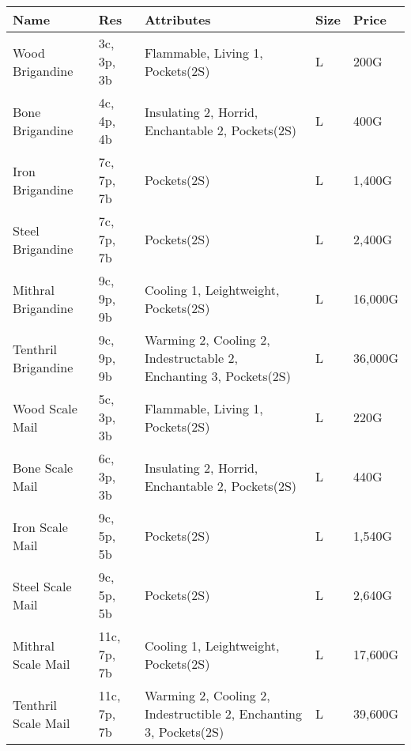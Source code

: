 \begin{longtable}{p{3.5cm} | p{1.5cm} | p{5cm} | p{1cm} | p{1.25cm}}
	Name & Res & Attributes & Size & Price\\ \hline
	Wood Brigandine & 3c, 3p, 3b & Flammable, Living 1, Pockets(2S) & L & 200G\\

	Bone Brigandine & 4c, 4p, 4b & Insulating 2, Horrid, Enchantable 2, Pockets(2S) & L & 400G\\

	Iron Brigandine & 7c, 7p, 7b & Pockets(2S) & L & 1,400G\\

	Steel Brigandine & 7c, 7p, 7b & Pockets(2S) & L & 2,400G\\

	Mithral Brigandine & 9c, 9p, 9b & Cooling 1, Leightweight, Pockets(2S) & L & 16,000G\\

	Tenthril Brigandine & 9c, 9p, 9b & Warming 2, Cooling 2, Indestructable 2, Enchanting 3, Pockets(2S) & L & 36,000G\\

	Wood Scale Mail & 5c, 3p, 3b & Flammable, Living 1, Pockets(2S) & L & 220G\\

	Bone Scale Mail & 6c, 3p, 3b & Insulating 2, Horrid, Enchantable 2, Pockets(2S) & L & 440G\\

	Iron Scale Mail & 9c, 5p, 5b & Pockets(2S) & L & 1,540G\\

	Steel Scale Mail & 9c, 5p, 5b & Pockets(2S) & L & 2,640G\\

	Mithral Scale Mail & 11c, 7p, 7b & Cooling 1, Leightweight, Pockets(2S) & L & 17,600G\\

	Tenthril Scale Mail & 11c, 7p, 7b & Warming 2, Cooling 2, Indestructible 2, Enchanting 3, Pockets(2S) & L & 39,600G\\
\end{longtable}

